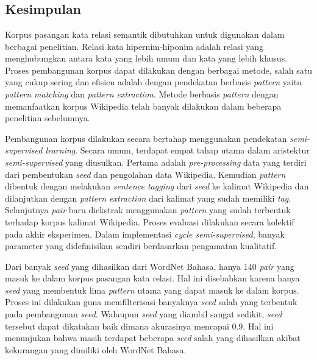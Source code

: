 \chapter{\babEnam}

\section{Kesimpulan}
Korpus pasangan kata relasi semantik dibutuhkan untuk digunakan dalam berbagai penelitian. Relasi kata hipernim-hiponim adalah relasi yang menghubungkan antara kata yang lebih umum dan kata yang lebih khusus. Proses pembangunan korpus dapat dilakukan dengan berbagai metode, salah satu yang cukup sering dan efisien adalah dengan pendekatan berbasis \textit{pattern} yaitu \textit{pattern matching} dan \textit{pattern extraction}. Metode berbasis \textit{pattern} dengan memanfaatkan korpus Wikipedia telah banyak dilakukan dalam beberapa penelitian sebelumnya. 

Pembangunan korpus dilakukan secara bertahap menggunakan pendekatan \textit{semi-supervised learning}. Secara umum, terdapat empat tahap utama dalam aristektur \textit{semi-supervised} yang diusulkan. Pertama adalah \textit{pre-processing} data yang terdiri dari pembentukan \textit{seed} dan pengolahan data Wikipedia. Kemudian \textit{pattern} dibentuk dengan melakukan \textit{sentence tagging} dari \textit{seed} ke kalimat Wikipedia dan dilanjutkan dengan \textit{pattern extraction} dari kalimat yang sudah memiliki \textit{tag}. Selanjutnya \textit{pair} baru diekstrak menggunakan \textit{pattern} yang sudah terbentuk terhadap korpus kalimat Wikipedia. Proses evaluasi dilakukan secara kolektif pada akhir eksperimen. Dalam implementasi \textit{cycle semi-supervised}, banyak parameter yang didefinisikan sendiri berdasarkan pengamatan kualitatif.

Dari banyak \textit{seed} yang dihasilkan dari WordNet Bahasa, hanya 140 \textit{pair} yang masuk ke dalam korpus pasangan kata relasi. Hal ini disebabkan karena hanya \textit{seed} yang membentuk lima \textit{pattern} utama yang dapat masuk ke dalam korpus. Proses ini dilakukan guna memfilterisasi banyaknya \textit{seed} salah yang terbentuk pada pembangunan \textit{seed}. Walaupun \textit{seed} yang diambil sangat sedikit, \textit{seed} tersebut dapat dikatakan baik dimana akurasinya mencapai 0.9. Hal ini menunjukan bahwa masih terdapat beberapa \textit{seed} salah yang dihasilkan akibat kekurangan yang dimiliki oleh WordNet Bahasa.

